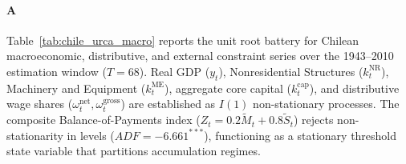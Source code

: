 \paragraph{A}
Table~\ref{tab:chile_urca_macro} reports the unit root battery for Chilean macroeconomic, distributive, and external constraint series over the 1943--2010 estimation window ($T=68$). Real GDP ($y_t$), Nonresidential Structures ($k^{\text{NR}}_t$), Machinery and Equipment ($k^{\text{ME}}_t$), aggregate core capital ($k^{\text{cap}}_t$), and distributive wage shares ($\omega^{\text{net}}_t, \omega^{\text{gross}}_t$) are established as $I(1)$ non-stationary processes. The composite Balance-of-Payments index ($Z_t = 0.2 \tilde{M}_t + 0.8 \tilde{S}_t$) rejects non-stationarity in levels ($ADF = -6.661^{***}$), functioning as a stationary threshold state variable that partitions accumulation regimes.

